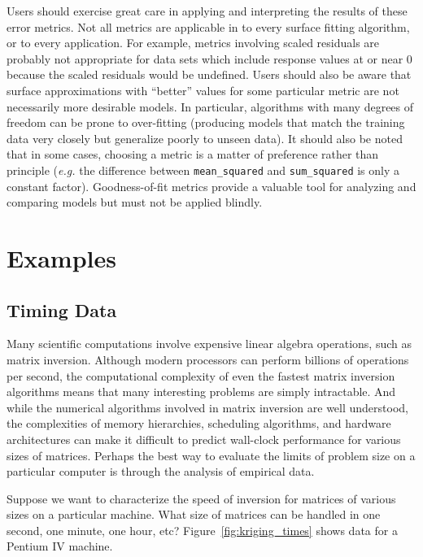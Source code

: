 \documentclass{article}
\begin{document}
Users should exercise great care in applying and interpreting the results of these error metrics.  Not all metrics are applicable in to every surface fitting algorithm, or to every application.  For example, metrics involving scaled residuals are probably not appropriate for data sets which include response values at or near 0 because the scaled residuals would be undefined.  Users should also be aware that surface approximations with ``better'' values for some particular metric are not necessarily more desirable models.  In particular, algorithms with many degrees of freedom can be prone to over-fitting (producing models that match the training data very closely but generalize poorly to unseen data).  It should also be noted that in some cases, choosing a metric is a matter of preference rather than principle ({\em e.g.} the difference between \texttt{mean\_squared} and \texttt{sum\_squared} is only a constant factor).  Goodness-of-fit metrics provide a valuable tool for analyzing and comparing models but must not be applied blindly.


\pagebreak
\section{Examples}
\subsection{Timing Data}
Many scientific computations involve expensive linear algebra operations, such
as matrix inversion.  Although modern processors can perform billions of
operations per second, the computational complexity of even the fastest matrix inversion
algorithms means that many interesting problems are simply intractable.  And while the
numerical algorithms involved in matrix inversion are well understood, the
complexities of memory hierarchies, scheduling algorithms, and hardware
architectures can make it difficult to predict wall-clock performance for
various sizes of matrices.  Perhaps the best way to evaluate the limits of
problem size on a particular computer is through the analysis of empirical data.

Suppose we want to characterize the speed of inversion for matrices of various
sizes on a particular machine.  What size of matrices can be handled in one
second, one minute, one hour, etc?  Figure~\ref{fig:kriging_times} shows data for a Pentium IV machine.  
\end{document}
